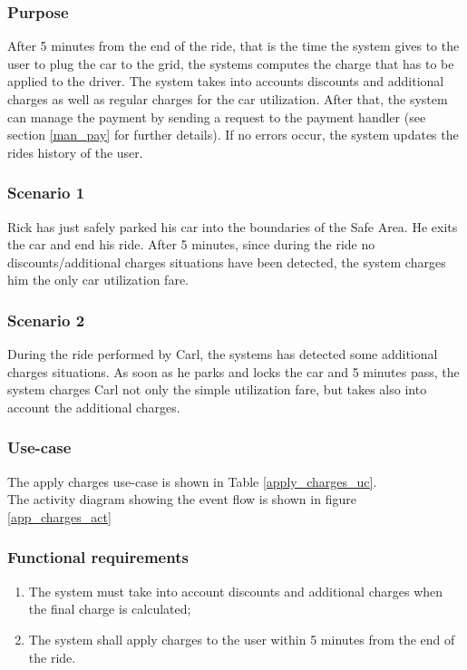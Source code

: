 \subsubsection{Purpose}
After 5 minutes from the end of the ride, that is the time the system gives to the user to plug the car to the grid, the systems computes the charge that has to be applied to the driver. The system takes into accounts discounts and additional charges as well as regular charges for the car utilization. After that, the system can manage the payment by sending a request to the payment handler (see section \ref{man_pay} for further details). If no errors occur, the system updates the rides history of the user.

\subsubsection{Scenario 1}
Rick has just safely parked his car into the boundaries of the Safe Area. He exits the car and end his ride. After 5 minutes, since during the ride no discounts/additional charges situations have been detected, the system charges him the only car utilization fare.

\subsubsection{Scenario 2}
During the ride performed by Carl, the systems has detected some additional charges situations. As soon as he parks and locks the car and 5 minutes pass, the system charges Carl not only the simple utilization fare, but takes also into account the additional charges.

\subsubsection{Use-case}
The apply charges use-case is shown in Table \ref{apply_charges_uc}. \\
The activity diagram showing the event flow is shown in figure \ref{app_charges_act}

\subsubsection{Functional requirements}
\begin{enumerate}
\item The system must take into account discounts and additional charges when the final charge is calculated;
\item The system shall apply charges to the user within 5 minutes from the end of the ride.
\end{enumerate}

